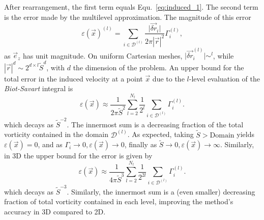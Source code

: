 \documentclass[preprint,12pt]{elsarticle}
\begin{document}
After rearrangement, the first term equals Equ.~\ref{eq:induced_1}. The second term is the error made by the multilevel approximation. The magnitude of this error
\begin{equation}
    \varepsilon(\vec{x})^{(l)} = 
    \sum_{i\in\mathcal{D}^{(l)}}\frac{\vert\vec{\delta r}_i\vert}{2\pi|\vec{r}|^2}\Gamma^{(l)}_i,
\end{equation}
as $\vec{e}_z$ has unit magnitude. On uniform Cartesian meshes, $\vert\vec{\delta r}_i^{(l)}\vert\sim^{l}$, while $|\vec{r}|^d \sim 2^{d\times l}\tilde{S}^d$, with $d$ the dimension of the problem. An upper bound for the total error in the induced velocity at a point $\vec x$ due to the $l$-level evaluation of the \emph{Biot-Savart} integral is
\begin{equation}
    \varepsilon(\vec{x}) \approx \frac{1}{2\pi\tilde{S}^2}\sum_{l=2}^{N_l}\frac{1}{2^l}\sum_{i\in\mathcal{D}^{(l)}}\Gamma^{(l)}_i.
\end{equation}
which decays as $\tilde{S}^{-2}$. The innermost sum is a decreasing fraction of the total vorticity contained in the domain $\mathcal{D}^{(l)}$. As expected, taking $\tilde{S}>\text{Domain}$ yields $\varepsilon(\vec{x}) = 0$, and as $\Gamma_i \to 0, \varepsilon(\vec{x})\to 0$, finally as $\tilde{S}\to0, \varepsilon(\vec{x}) \to \infty$. Similarly, in 3D the upper bound for the error is given by
\begin{equation}
    \varepsilon(\vec{x}) \approx \frac{1}{4\pi\tilde{S}^3}\sum_{l=2}^{N_l}\frac{1}{2^{2l}}\sum_{i\in\mathcal{D}^{(l)}}\Gamma^{(l)}_i.
\end{equation}
which decays as $\tilde{S}^{-3}$. Similarly, the innermost sum is a (even smaller) decreasing fraction of total vorticity contained in each level, improving the method's accuracy in 3D compared to 2D.



\end{document}
